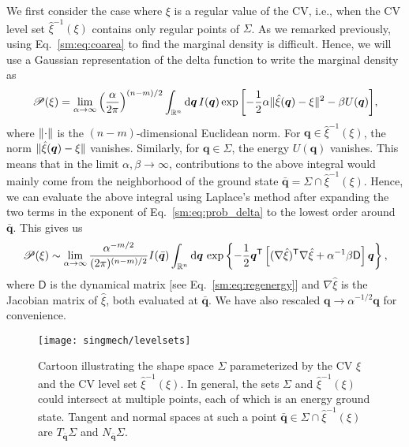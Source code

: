 We first consider the case where $\xi$ is a regular value of the CV, i.e., when the CV level set $\hat{\xi}^{-1}(\xi)$ contains only regular points of $\Sigma$.
As we remarked previously, using Eq.~\eqref{sm:eq:coarea} to find the marginal density is difficult.
Hence, we will use a Gaussian representation of the delta function to write the marginal density as~\cite{hartmann2007a,hartmann2011}
%
\begin{equation}
  \mathscr{P}(\xi) = \lim_{\alpha\to\infty} \left(\frac{\alpha}{2\pi}\right)^{(n-m)/2} \int_{\mathbb{R}^n} \mathrm{d} \bm{q}\, I(\bm{q}) \exp{\left[-\frac{1}{2}\alpha\lVert\hat{\xi}(\bm{q}) - \xi\rVert^2 - \beta U(\bm{q})\right]},
  \label{sm:eq:prob_delta}
\end{equation}
%
where $\lVert\cdot\rVert$ is the $(n-m)$-dimensional Euclidean norm.
For $\bm{q} \in \hat{\xi}^{-1}(\xi)$, the norm $\lVert\hat{\xi}(\bm{q}) - \xi\rVert$ vanishes.
Similarly, for $\bm{q} \in \Sigma$, the energy $U(\bm{q})$ vanishes.
This means that in the limit $\alpha, \beta \to \infty$, contributions to the above integral would mainly come from the neighborhood of the ground state $\bar{\bm{q}} = \Sigma \cap \hat{\xi}^{-1}(\xi)$.
Hence, we can evaluate the above integral using Laplace's method after expanding the two terms in the exponent of Eq.~\eqref{sm:eq:prob_delta} to the lowest order around $\bar{\bm{q}}$.
This gives us
%
\begin{equation}
  \mathscr{P}(\xi) \sim \lim_{\alpha\to\infty} \frac{\alpha^{-m/2}}{(2\pi)^{(n-m)/2}}I(\bar{\bm{q}})\int_{\mathbb{R}^n} \mathrm{d}{\bm{q}}\, \exp\left\{-\frac{1}{2}\bm{q}^\mathsf{T}\left[(\nabla\hat{\xi})^\mathsf{T}\nabla\hat{\xi} + \alpha^{-1}\beta \mathsf{D}\right]\bm{q}\right\},
  \label{sm:eq:prob_gaussian}
\end{equation}
%
where $\mathsf{D}$ is the dynamical matrix [see Eq.~\eqref{sm:eq:regenergy}] and $\nabla\hat{\xi}$ is the Jacobian matrix of $\hat{\xi}$, both evaluated at $\bar{\bm{q}}$.
We have also rescaled $\bm{q} \to \alpha^{-1/2}\bm{q}$ for convenience.
%
\begin{figure}
  \begin{center}
    \texttt{[image: singmech/levelsets]}
  \end{center}
  \caption{Cartoon illustrating the shape space $\Sigma$ parameterized by the CV $\xi$ and the CV level set $\hat{\xi}^{-1}(\xi)$.
    In general, the sets $\Sigma$ and $\hat{\xi}^{-1}(\xi)$ could intersect at multiple points, each of which is an energy ground state.
    Tangent and normal spaces at such a point $\bar{\bm{q}} \in \Sigma \cap \hat{\xi}^{-1}(\xi)$ are $T_{\bar{\bm{q}}}\Sigma$ and $N_{\bar{\bm{q}}}\Sigma$.}
  \label{sm:fig:levelsets}
\end{figure}

